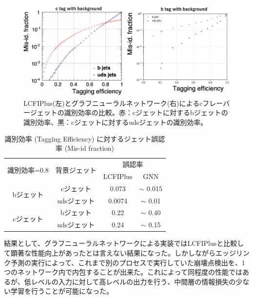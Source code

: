 \begin{figure}[H]
	\begin{center}
 \includegraphics[keepaspectratio, scale=0.33]
 	{Figure/Flavortagging/gnneff_c.png}
 		\caption{LCFIPlus(左)とグラフニューラルネットワーク(右)によるcフレーバージェットの識別効率の比較。赤：cジェットに対するbジェットの識別効率、黒：cジェットに対するudsジェットの識別効率。}
 		\label{gnneff_c}
	\end{center}
\end{figure}

\begin{table}[H]
 \centering
  \begin{tabular}{ |c|c|c|c|}
   \hline
   \multirow{2}{*}{識別効率=0.8} & \multirow{2}{*}{背景ジェット} & \multicolumn{2}{c|}{誤認率} \\ \cline{3-4} 
    & & LCFIPlus & GNN\\ \cline{3-4} 
    \hline \hline
   \multirow{2}{*}{bジェット} & cジェット & 0.073 & $\sim$ 0.015\\ \cline{2-2} 
   & udsジェット & 0.0074 & $\sim$ 0.01 \\ \cline{1-2} 
   \multirow{2}{*}{cジェット} & bジェット & 0.22 & $\sim$ 0.40\\ \cline{2-2} 
   & udsジェット & 0.24 & $\sim$ 0.15\\
   \hline
  \end{tabular}
  \caption{識別効率 (Tagging Efficiency) に対するジェット誤認率 (Mis-id fraction)}
  \label{gnn_lcfi}
\end{table}
結果として、グラフニューラルネットワークによる実装ではLCFIPlusと比較して顕著な性能向上があったとは言えない結果になった。しかしながらエッジリンク予測の実行によって、これまで別のプロセスで実行していた崩壊点検出を、1つのネットワーク内で内包することが出来た。これによって同程度の性能ではあるが、低レベルの入力に対して高レベルの出力を行う、中間層の情報損失の少ない学習を行うことが可能になった。